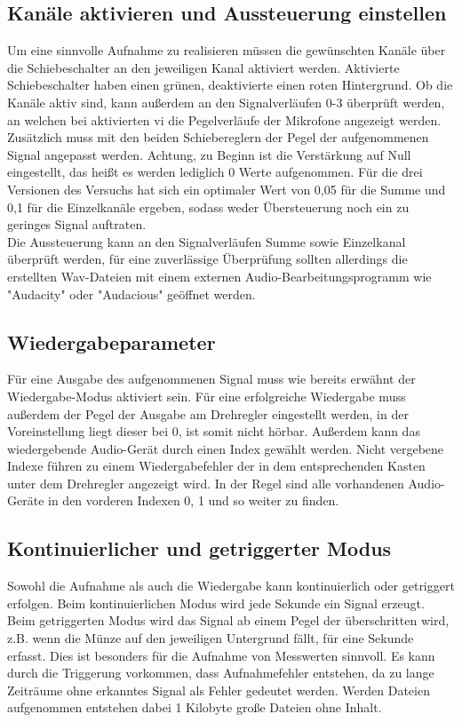 \subsection{Kanäle aktivieren und Aussteuerung einstellen}
Um eine sinnvolle Aufnahme zu realisieren müssen die gewünschten Kanäle über die Schiebeschalter an den jeweiligen Kanal aktiviert werden. Aktivierte Schiebeschalter haben einen grünen, deaktivierte einen roten Hintergrund. Ob die Kanäle aktiv sind, kann außerdem an den Signalverläufen 0-3 überprüft werden, an welchen bei aktivierten vi die Pegelverläufe der Mikrofone angezeigt werden.\\
Zusätzlich muss mit den beiden Schiebereglern der Pegel der aufgenommenen Signal angepasst werden. Achtung, zu Beginn ist die Verstärkung auf Null eingestellt, das heißt es werden lediglich 0 Werte aufgenommen. Für die drei Versionen des Versuchs hat sich ein optimaler Wert von 0,05 für die Summe und 0,1 für die Einzelkanäle ergeben, sodass weder Übersteuerung noch ein zu geringes Signal auftraten. \\
Die Aussteuerung kann an den Signalverläufen Summe sowie Einzelkanal überprüft werden, für eine zuverlässige Überprüfung sollten allerdings die erstellten Wav-Dateien mit einem externen Audio-Bearbeitungsprogramm wie "Audacity" oder "Audacious" geöffnet werden.

\subsection{Wiedergabeparameter}

Für eine Ausgabe des aufgenommenen Signal muss wie bereits erwähnt der Wiedergabe-Modus aktiviert sein. Für eine erfolgreiche Wiedergabe muss außerdem der Pegel der Ausgabe am Drehregler eingestellt werden, in der Voreinstellung liegt dieser bei 0, ist somit nicht hörbar. Außerdem kann das wiedergebende Audio-Gerät durch einen Index gewählt werden. Nicht vergebene Indexe führen zu einem Wiedergabefehler der in dem entsprechenden Kasten unter dem Drehregler angezeigt wird. In der Regel sind alle vorhandenen Audio-Geräte in den vorderen Indexen 0, 1 und so weiter zu finden.

\subsection{Kontinuierlicher und getriggerter Modus}

Sowohl die Aufnahme als auch die Wiedergabe kann kontinuierlich oder getriggert erfolgen. Beim kontinuierlichen Modus wird jede Sekunde ein Signal erzeugt. \\
Beim getriggerten Modus wird das Signal ab einem  Pegel der überschritten wird, z.B. wenn die Münze auf den jeweiligen Untergrund fällt, für eine Sekunde erfasst. Dies ist besonders für die Aufnahme von Messwerten sinnvoll. Es kann durch die Triggerung vorkommen, dass Aufnahmefehler entstehen, da zu lange Zeiträume ohne erkanntes Signal als Fehler gedeutet werden. Werden Dateien aufgenommen entstehen dabei 1 Kilobyte große Dateien ohne Inhalt.

